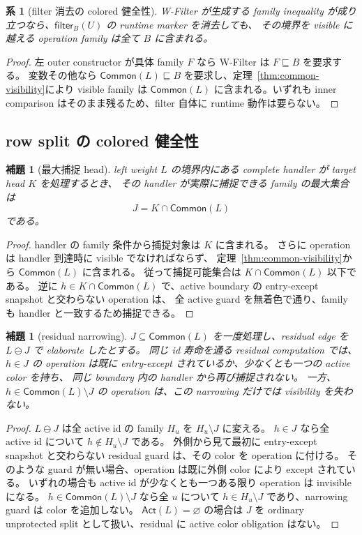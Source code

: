 \documentclass[uplatex,dvipdfmx,a4paper,10.5pt]{jsarticle}
\theoremstyle{jpplain}
\newtheorem{lemma}[definition]{補題}
\newtheorem{corollary}[definition]{系}
\newcommand{\Common}{\mathsf{Common}}
\newcommand{\Filter}[2]{\mathsf{filter}_{#1}(#2)}
\begin{document}
\begin{corollary}[filter 消去の colored 健全性]\label{cor:filter-erasure}
W-Filter が生成する family inequality が成り立つなら、$\Filter{B}{U}$ の runtime marker を消去しても、
その境界を visible に越える operation family は全て $B$ に含まれる。
\end{corollary}

\begin{proof}
左 outer constructor が具体 family $F$ なら W-Filter は $F\sqsubseteq B$ を要求する。
変数その他なら $\Common(L)\sqsubseteq B$ を要求し、定理~\ref{thm:common-visibility}により visible family は
$\Common(L)$ に含まれる。いずれも inner comparison はそのまま残るため、filter 自体に runtime 動作は要らない。
\end{proof}

\subsection{row split の colored 健全性}

\begin{lemma}[最大捕捉 head]\label{lem:max-colored-head}
left weight $L$ の境界内にある complete handler が target head $K$ を処理するとき、
その handler が実際に捕捉できる family の最大集合は
\[
  J=K\cap\Common(L)
\]
である。
\end{lemma}

\begin{proof}
handler の family 条件から捕捉対象は $K$ に含まれる。
さらに operation は handler 到達時に visible でなければならず、
定理~\ref{thm:common-visibility}から $\Common(L)$ に含まれる。
従って捕捉可能集合は $K\cap\Common(L)$ 以下である。
逆に $h\in K\cap\Common(L)$ で、active boundary の entry-except snapshot と交わらない operation は、
全 active guard を無着色で通り、family も handler と一致するため捕捉できる。
\end{proof}

\begin{lemma}[residual narrowing]\label{lem:residual-narrowing}
$J\subseteq\Common(L)$ を一度処理し、residual edge を $L\ominus J$ で elaborate したとする。
同じ id 寿命を通る residual computation では、$h\in J$ の operation は既に entry-except されているか、少なくとも一つの active color を持ち、
同じ boundary 内の handler から再び捕捉されない。
一方、$h\in\Common(L)\setminus J$ の operation は、この narrowing だけでは visibility を失わない。
\end{lemma}

\begin{proof}
$L\ominus J$ は全 active id の family $H_u$ を $H_u\setminus J$ に変える。
$h\in J$ なら全 active id について $h\notin H_u\setminus J$ である。
外側から見て最初に entry-except snapshot と交わらない residual guard は、その color を operation に付ける。
そのような guard が無い場合、operation は既に外側 color により except されている。
いずれの場合も active id が少なくとも一つある限り operation は invisible になる。
$h\in\Common(L)\setminus J$ なら全 $u$ について $h\in H_u\setminus J$ であり、narrowing guard は color を追加しない。
$\mathsf{Act}(L)=\varnothing$ の場合は $J$ を ordinary unprotected split として扱い、residual に active color obligation はない。
\end{proof}
\end{document}
